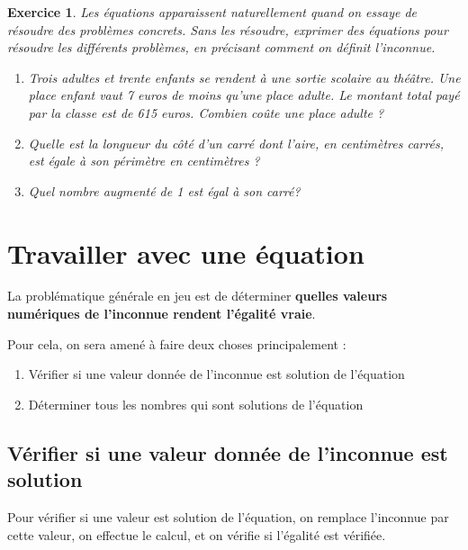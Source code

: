 \documentclass[10pt,a4paper]{book}
\newtheorem{exo}{Exercice}
\begin{document}
\begin{exo} 
Les équations apparaissent naturellement quand on essaye de résoudre des problèmes concrets. Sans les résoudre, exprimer des équations pour résoudre les différents problèmes, en précisant comment on définit l'inconnue.
    \begin{enumerate}
        \item Trois adultes et trente enfants se rendent à une sortie scolaire au théâtre. Une place enfant vaut 7 euros de moins qu'une place adulte. Le montant total payé par la classe est de 615 euros. Combien coûte une place adulte ?
        \item Quelle est la longueur du côté d'un carré dont l'aire, en centimètres carrés, est égale à son périmètre en centimètres ?
        \item Quel nombre augmenté de 1 est égal à son carré?
    \end{enumerate}
\end{exo}


\section{Travailler avec une équation}

La problématique générale en jeu est de déterminer \textbf{quelles valeurs numériques de l'inconnue rendent l'égalité vraie}.

Pour cela, on sera amené à faire deux choses principalement :

\begin{enumerate}
    \item Vérifier si une valeur donnée de l'inconnue est solution de l'équation
    \item Déterminer tous les nombres qui sont solutions de l'équation
    
    
\end{enumerate}


\subsection{Vérifier si une valeur donnée de l'inconnue est solution}



\begin{met} 
Pour vérifier si une valeur est solution de l'équation, on remplace l'inconnue par cette valeur, on effectue le calcul, et on vérifie si l'égalité est vérifiée.
\end{met}
\end{document}
